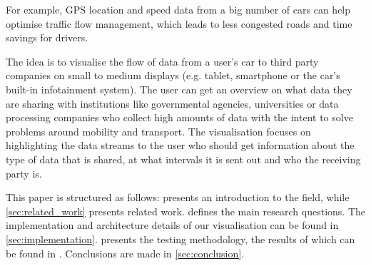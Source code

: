 \documentclass[../paper.tex]{subfiles}
\begin{document}
  For example, GPS location and speed data from a big number of cars can help
  optimise traffic flow management, which leads to less congested roads and
  time savings for drivers.


  The idea is to visualise the flow of data from a user’s car to third party
  companies on small to medium displays (e.g. tablet, smartphone or the car’s
  built-in infotainment system). The user can get an overview on what data they
  are sharing with institutions like governmental agencies, universities or
  data processing companies who collect high amounts of data with the intent to
  solve problems around mobility and transport. The visualisation
  focuses on highlighting the data streams to the user who should get
  information about the type of data that is shared, at what intervals it is
  sent out and who the receiving party is.

  This paper is structured as follows:  presents an
  introduction to the field, while \cref{sec:related_work} presents related
  work.  defines the main research questions. 
  The implementation and architecture details of our visualisation can be found in \cref{sec:implementation}.  presents the
  testing methodology, the results of which can be found in .
  Conclusions are made in \cref{sec:conclusion}.
\end{document}
